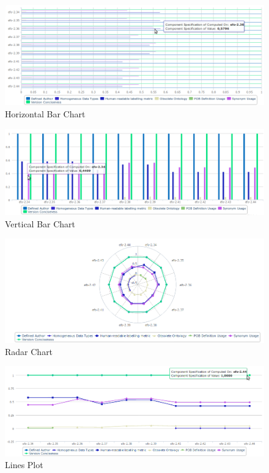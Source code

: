 \begin{figure}[tbph]
\center
  \includegraphics[scale=0.3]{images/cube_1.png}
\caption{Horizontal Bar Chart} 
  \label{fig:hor_chart}
\end{figure}

\begin{figure}[tbph]
\center
\includegraphics[scale=0.3]{images/cube_2.png} 
\caption{Vertical Bar Chart} 
\label{fig:ver_chart}
\end{figure}

\begin{figure}[tbph]
\center
\includegraphics[scale=0.3]{images/cube_3.png} 
\caption{Radar Chart} 
\label{fig:rad_chart}
\end{figure}

\begin{figure}[tbph]
\center
\includegraphics[scale=0.3]{images/cube_4.png} 
\caption{Lines Plot} 
\label{fig:line_chart}
\end{figure}

